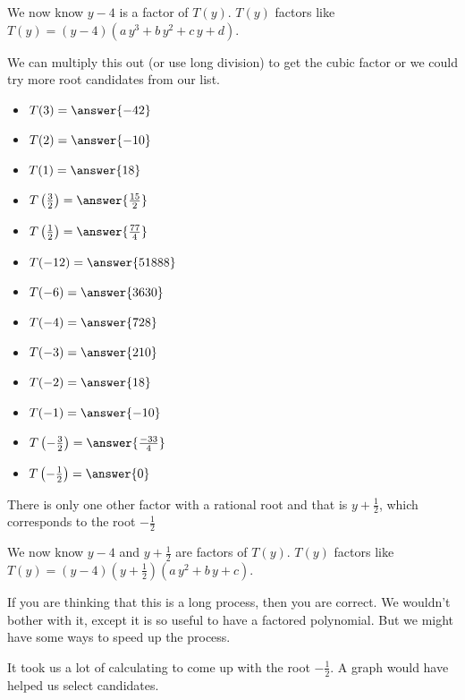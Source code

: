 \documentclass{ximera}
\begin{document}
\begin{example}
We now know $y-4$ is a factor of $T(y)$.  $T(y)$ factors like $T(y) = (y-4) (a \, y^3 + b \, y^2 + c \, y + d)$. 

We can  multiply this out (or use long division) to get the cubic factor or we could try more root candidates from our list.


\begin{itemize}
\item $T(3) =  \answer{-42}$  
\item $T(2) =  \answer{-10}$  
\item $T(1) =  \answer{18}$  
\item $T\left(\tfrac{3}{2}\right) =  \answer{\frac{15}{2}}$  
\item $T\left(\tfrac{1}{2}\right) =  \answer{\frac{77}{4}}$  
\item $T(-12) =  \answer{51888}$  
\item $T(-6) =  \answer{3630}$  
\item $T(-4) =  \answer{728}$  
\item $T(-3) =  \answer{210}$  
\item $T(-2) =  \answer{18}$  
\item $T(-1) =  \answer{-10}$  
\item $T\left(-\tfrac{3}{2}\right) =  \answer{\frac{-33}{4}}$  
\item $T\left(-\tfrac{1}{2}\right) =  \answer{0}$  
\end{itemize}

There is only one other factor with a rational root and that is $y+\frac{1}{2}$, which corresponds to the root $-\frac{1}{2}$ 



We now know $y-4$ and $y+\frac{1}{2}$ are factors of $T(y)$.  $T(y)$ factors like $T(y) = (y-4) \left(y+\frac{1}{2}\right) (a \, y^2 + b \, y + c)$. 





\end{example}











If you are thinking that this is a long process, then you are correct.  We wouldn't bother with it, except it is so useful to have a factored polynomial.  But we might have some ways to speed up the process.  

It took us a lot of calculating to come up with the root $-\frac{1}{2}$.  A graph would have helped us select candidates.
\end{document}
